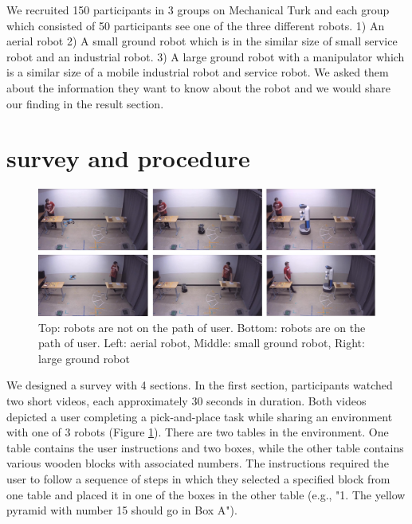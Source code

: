 \documentclass[letterpaper, 10 pt, conference]{ieeeconf}  %
\begin{document}
We recruited 150 participants in 3 groups on Mechanical Turk and each group which consisted of 50 participants see one of the three different robots. 1) An aerial robot 2) A small ground robot which is in the similar size of small service robot and an industrial robot. 3) A large ground robot with a manipulator which is a similar size of a mobile industrial robot and service robot. We asked them about the information they want to know about the robot and we would share our finding in the result section.

\section{survey and procedure} \label{survey}

\begin{figure}
\centering
\includegraphics[width=\textwidth]{figures/task3robots.jpg}
\caption{Top: robots are not on the path of user. Bottom: robots are on the path of user. Left: aerial robot, Middle: small ground robot, Right: large ground robot }
\label{fig:task}
\end{figure}

    We designed a survey with 4 sections. In the first section, participants watched two short videos, each approximately 30 seconds in duration. Both videos depicted a user completing a pick-and-place task while sharing an environment with one of 3 robots (Figure \ref{fig:task}). There are two tables in the environment. One table contains the user instructions and two boxes, while the other table contains various wooden blocks with associated numbers. The instructions required the user to follow a sequence of steps in which they selected a specified block from one table and placed it in one of the boxes in the other table (e.g., "1. The yellow pyramid with number 15 should go in Box A"). 
    
\end{document}
